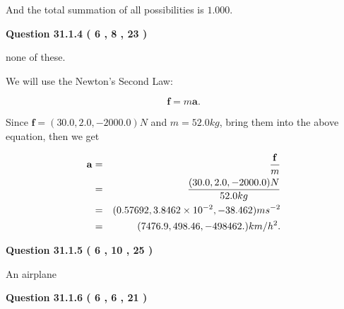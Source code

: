 \documentclass[12pt]{article}
\begin{document}
\noindent
 And the total summation of all possibilities is $  %
1.000 $.
 
 
 
  
\vspace{0.2in}
  
{\textbf{\Large{Question
31.1.4 
 (           6 ,           8 ,          23 )
}}}
  
  
 
 
\noindent{}
 
 
none of these.
 
 
 
 
 
 
\noindent{}

We will use the Newton's Second Law:
 
\[
\mathbf{f}=m\mathbf{a}.
\]
 
Since $\mathbf{f}=( %
30.0,  %
2.0,  %
-2000.0 )N$
and $m= %
52.0kg$, bring them into the above equation, then we get
 
\begin{eqnarray*}
\mathbf{a}&=&\frac{\mathbf{f}}m  \\
&=&\frac{(
30.0 ,
2.0 ,
-2000.0 )N
}{ %
52.0 kg}  \\
&=&(
0.57692 ,
3.8462 \times 10^{-2},
-38.462
)ms^{-2} \\
&=&(
7476.9 ,
498.46 ,
-498462.
)km/h^2.
\end{eqnarray*}
 
 
 
  
\vspace{0.2in}
  
{\textbf{\Large{Question
31.1.5 
 (           6 ,          10 ,          25 )
}}}
  
  
 
 
\noindent{}
 
 
An airplane
 
 
 
 
  
\vspace{0.2in}
  
{\textbf{\Large{Question
31.1.6 
 (           6 ,           6 ,          21 )
}}}
  
  
 
 
\noindent{}
\end{document}
